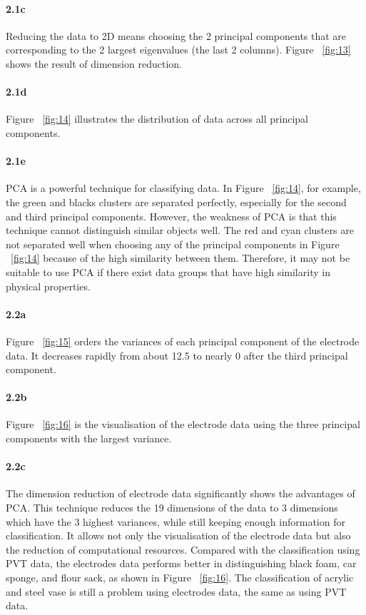 \documentclass[10pt,twocolumn,letterpaper]{article}
\begin{document}
\paragraph{2.1c}
Reducing the data to 2D means choosing the 2 principal components that are corresponding to the 2 largest eigenvalues (the last 2 columns). Figure ~\ref{fig:13} shows the result of dimension reduction.

\paragraph{2.1d}
Figure ~\ref{fig:14} illustrates the distribution of data across all principal components.

\paragraph{2.1e}
PCA is a powerful technique for classifying data. In Figure ~\ref{fig:14}, for example, the green and blacks clusters are separated perfectly, especially for the second and third principal components. However, the weakness of PCA is that this technique cannot distinguish similar objects well. The red and cyan clusters are not separated well when choosing any of the principal components in Figure ~\ref{fig:14} because of the high similarity between them. Therefore, it may not be suitable to use PCA if there exist data groups that have high similarity in physical properties.


\paragraph{2.2a}
Figure ~\ref{fig:15} orders the variances of each principal component of the electrode data. It decreases rapidly from about 12.5 to nearly 0 after the third principal component.

\paragraph{2.2b}
Figure ~\ref{fig:16} is the visualisation of the electrode data using the three principal components with the largest variance. 

\paragraph{2.2c}
The dimension reduction of electrode data significantly shows the advantages of PCA. This technique reduces the 19 dimensions of the data to 3 dimensions which have the 3 highest variances, while still keeping enough information for classification. It allows not only the visualisation of the electrode data but also the reduction of computational resources. Compared with the classification using PVT data, the electrodes data performs better in distinguishing black foam, car sponge, and flour sack, as shown in Figure ~\ref{fig:16}. The classification of acrylic and steel vase is still a problem using electrodes data, the same as using PVT data.
\end{document}
